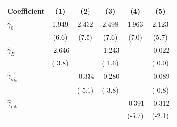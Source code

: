 \begin{tabular}{lccccc}
\toprule
Coefficient & (1) & (2) & (3) & (4) & (5) \\
\midrule
$\hat\gamma_0$ & 1.949 & 2.432 & 2.498 & 1.963 & 2.123 \\
 & (6.6) & (7.5) & (7.6) & (7.0) & (5.7) \\
$\hat\gamma_B$ & -2.646 &  & -1.243 &  & -0.022 \\
 & (-3.8) &  & (-1.6) &  & (-0.0) \\
$\hat\gamma_{\sigma^2_m}$ &  & -0.334 & -0.280 &  & -0.089 \\
 &  & (-5.1) & (-3.8) &  & (-0.8) \\
$\hat\gamma_{\text{int}}$ &  &  &  & -0.391 & -0.312 \\
 &  &  &  & (-5.7) & (-2.1) \\
\bottomrule
\end{tabular}
